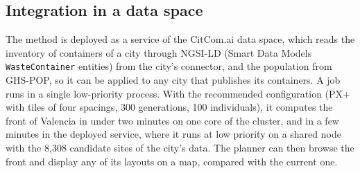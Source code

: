 \subsection{Integration in a data space}
The method is deployed as a service of the CitCom.ai data space, which reads the inventory of containers of a city through NGSI-LD (Smart Data Models \texttt{WasteContainer} entities) from the city's connector, and the population from GHS-POP, so it can be applied to any city that publishes its containers. A job runs in a single low-priority process. With the recommended configuration (PX+ with tiles of four spacings, 300 generations, 100 individuals), it computes the front of Valencia in under two minutes on one core of the cluster, and in a few minutes in the deployed service, where it runs at low priority on a shared node with the 8,308 candidate sites of the city's data. The planner can then browse the front and display any of its layouts on a map, compared with the current one.
